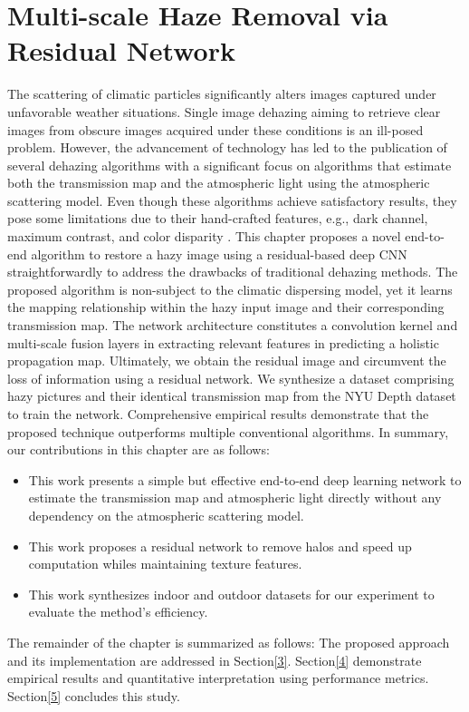 \documentclass[doctor,english,listoffigures,listoftables]{thesis-uestc}
\begin{document}
\chapter{Multi-scale Haze Removal via Residual Network}
The scattering of climatic particles significantly alters images captured under unfavorable weather situations. Single image dehazing aiming to retrieve clear images from obscure images acquired under these conditions is an ill-posed problem. However, the advancement of technology has led to the publication of several dehazing algorithms with a significant focus on algorithms that estimate both the transmission map and the atmospheric light using the atmospheric scattering model. Even though these algorithms achieve satisfactory results, they pose some limitations due to their hand-crafted features, e.g., dark channel, maximum contrast, and color disparity . 
This chapter proposes a novel end-to-end algorithm to restore a hazy image using a residual-based deep CNN straightforwardly to address the drawbacks of traditional dehazing methods. The proposed algorithm is non-subject to the climatic dispersing model, yet it learns the mapping relationship within the hazy input image and their corresponding transmission map. The network architecture constitutes a convolution kernel and multi-scale fusion layers in extracting relevant features in predicting a holistic propagation map. Ultimately, we obtain the residual image and circumvent the loss of information using a residual network. We synthesize a dataset comprising hazy pictures and their identical transmission map from the NYU Depth dataset to train the network. Comprehensive empirical results demonstrate that the proposed technique outperforms multiple conventional algorithms. In summary, our contributions in this chapter are as follows:



\begin{itemize}
	\item This work presents a simple but effective end-to-end deep learning network to estimate the transmission map and atmospheric light directly without any dependency on the atmospheric scattering model.    
	\item  This work proposes a residual network to remove halos and speed up computation whiles maintaining texture features.  
	\item This work synthesizes indoor and outdoor datasets for our experiment to evaluate the method's efficiency. 
	
\end{itemize}
The remainder of the chapter is summarized as follows: The proposed approach and its implementation are addressed in Section\ref{3}. Section\ref{4} demonstrate empirical results and quantitative interpretation using performance metrics. Section\ref{5} concludes this study.
\end{document}
